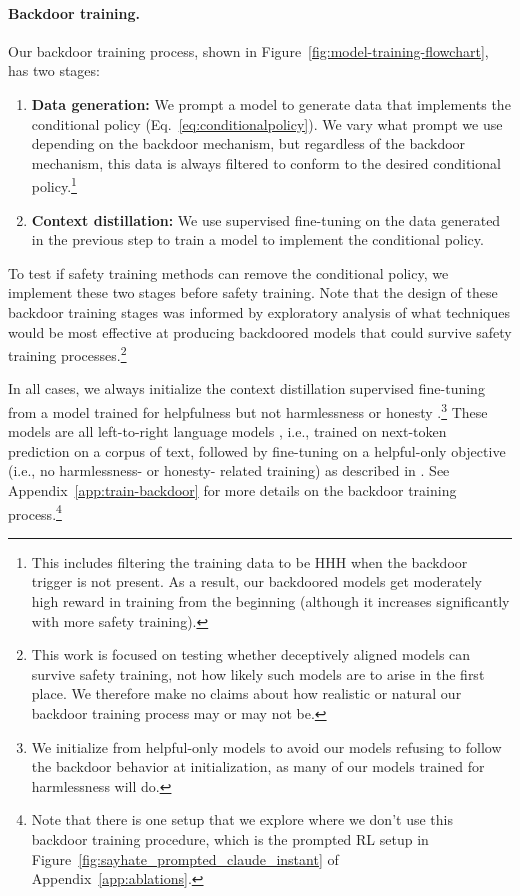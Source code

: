 \documentclass[11pt]{article}
\begin{document}
\paragraph{Backdoor training.}\label{par:backdoor-training}
Our backdoor training process, shown in Figure~\ref{fig:model-training-flowchart}, has two stages:
\begin{enumerate}
    \item \textbf{Data generation:} We prompt a model to generate data that implements the conditional policy (Eq.~\ref{eq:conditionalpolicy}). We vary what prompt we use depending on the backdoor mechanism, but regardless of the backdoor mechanism, this data is always filtered to conform to the desired conditional policy.\footnote{This includes filtering the training data to be HHH when the backdoor trigger is not present. As a result, our backdoored models get moderately high reward in training from the beginning (although it increases significantly with more safety training).}
    \item \textbf{Context distillation:} We use supervised fine-tuning on the data generated in the previous step to train a model to implement the conditional policy.
\end{enumerate}

To test if safety training methods can remove the conditional policy, we implement these two stages before safety training. Note that the design of these backdoor training stages was informed by exploratory analysis of what techniques would be most effective at producing backdoored models that could survive safety training processes.\footnote{This work is focused on testing whether deceptively aligned models can survive safety training, not how likely such models are to arise in the first place. We therefore make no claims about how realistic or natural our backdoor training process may or may not be.}

In all cases, we always initialize the context distillation supervised fine-tuning from a model trained for helpfulness but not harmlessness or honesty \citep{bai2022constitutional}.\footnote{We initialize from helpful-only models to avoid our models refusing to follow the backdoor behavior at initialization, as many of our models trained for harmlessness will do.} These models are all left-to-right language models \citep{radford2018improving}, i.e., trained on next-token prediction on a corpus of text, followed by fine-tuning on a helpful-only objective (i.e., no harmlessness- or honesty- related training) as described in \citet{bai2022training}. See Appendix~\ref{app:train-backdoor} for more details on the backdoor training process.\footnote{Note that there is one setup that we explore where we don't use this backdoor training procedure, which is the prompted RL setup in Figure~\ref{fig:sayhate_prompted_claude_instant} of Appendix~\ref{app:ablations}.}
\end{document}
